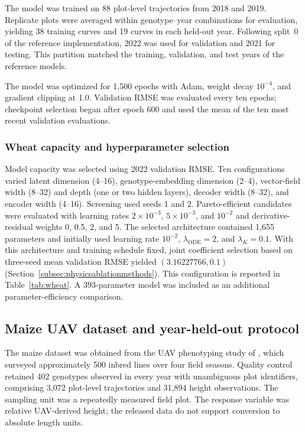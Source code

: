 \documentclass[preprint,12pt,authoryear]{elsarticle}
\begin{document}
The model was trained on 88 plot-level trajectories from 2018 and 2019. Replicate plots were averaged within genotype--year combinations for evaluation, yielding 38 training curves and 19 curves in each held-out year. Following split~0 of the reference implementation, 2022 was used for validation and 2021 for testing. This partition matched the training, validation, and test years of the reference models.

The model was optimized for 1,500 epochs with Adam, weight decay $10^{-4}$, and gradient clipping at 1.0. Validation RMSE was evaluated every ten epochs; checkpoint selection began after epoch 600 and used the mean of the ten most recent validation evaluations.

\subsubsection{Wheat capacity and hyperparameter selection}

Model capacity was selected using 2022 validation RMSE. Ten configurations varied latent dimension (4--16), genotype-embedding dimension (2--4), vector-field width (8--32) and depth (one or two hidden layers), decoder width (8--32), and encoder width (4--16). Screening used seeds 1 and 2. Pareto-efficient candidates were evaluated with learning rates $2\times10^{-3}$, $5\times10^{-3}$, and $10^{-2}$ and derivative-residual weights 0, 0.5, 2, and 5. The selected architecture contained 1,655 parameters and initially used learning rate $10^{-2}$, $\lambda_{\mathrm{ODE}}=2$, and $\lambda_K=0.1$. With this architecture and training schedule fixed, joint coefficient selection based on three-seed mean validation RMSE yielded $(3.16227766,0.1)$ (Section~\ref{subsec:physicsablationmethods}). This configuration is reported in Table~\ref{tab:wheat}. A 393-parameter model was included as an additional parameter-efficiency comparison.

\subsection{Maize UAV dataset and year-held-out protocol}
\label{subsec:maizedata}

The maize dataset was obtained from the UAV phenotyping study of \citet{sweet2024maize}, which surveyed approximately 500 inbred lines over four field seasons. Quality control retained 402 genotypes observed in every year with unambiguous plot identifiers, comprising 3,072 plot-level trajectories and 31,894 height observations. The sampling unit was a repeatedly measured field plot. The response variable was relative UAV-derived height; the released data do not support conversion to absolute length units.
\end{document}
